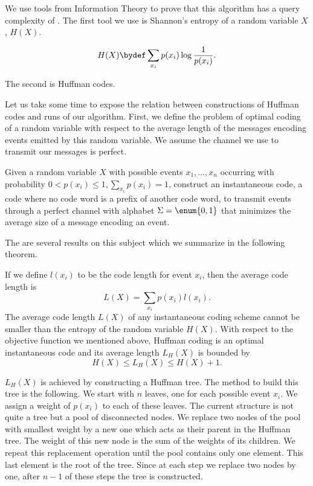 We use tools from Information Theory to prove that this algorithm has
a query complexity of \BigO{\ITLB}. The first tool we use is Shannon's entropy of a random
variable \(X\), \(H(X)\).
\begin{definition}
\begin{displaymath}
H(X) \bydef \sum_{x_i} p(x_i) \log \frac{1}{p(x_i)}.
\end{displaymath}
\end{definition}
The second is Huffman codes.

Let us take some time to expose the relation between constructions of Huffman
codes and runs of our algorithm. First, we define the problem of optimal
coding of a random variable with respect to the average length of the messages
encoding events emitted by this random variable. We assume the channel we
use to transmit our messages is perfect.
\begin{problem}
Given a random variable \(X\) with possible events \(x_1,\ldots,x_n\) occurring
with probability \(0 < p(x_i) \le 1, \sum_{x_i} p(x_i) = 1\), construct an
instantaneous code, \ie a code where no code word is a prefix of another code
word, to transmit events through a perfect channel with alphabet
\(\Sigma = \enum{0,1}\) that minimizes the average size of a message encoding
an event.
\end{problem}

The are several results on this subject which we summarize in the
following theorem.
\begin{theorem}
If we define \(l(x_i)\) to be the code
length for event \(x_i\), then the average code length is
\begin{displaymath}
L(X) = \sum_{x_i} p(x_i) l(x_i).
\end{displaymath}
The average code length \(L(X)\) of any instantaneous coding scheme cannot be smaller than
the entropy of the random variable \(H(X)\).
With respect to the objective function we mentioned above, Huffman coding is
an optimal instantaneous code and its average length \(L_H(X)\) is bounded by
\begin{displaymath}
H(X) \le L_H(X) \le H(X) + 1.
\end{displaymath}
\end{theorem}

\(L_H(X)\) is achieved by constructing a Huffman tree. The method to build this
tree is the following. We start with \(n\) leaves, one for each possible event
\(x_i\). We assign a weight of \(p(x_i)\) to each of these leaves. The current
structure is not quite a tree but a pool of disconnected nodes. We
replace two nodes of the pool with smallest weight by a new one which
acts as their parent in the Huffman tree. The weight of this new node is
the sum of the weights of its children. We repeat this
replacement operation until the pool contains only one element. This last
element is the root of the tree. Since at each step we replace two nodes by
one, after \(n-1\) of these steps the tree is constructed.

